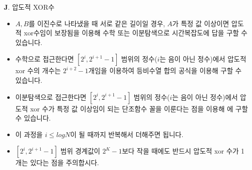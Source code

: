 \begin{frame}{\textbf{J}. 압도적 XOR수}
	\begin{itemize}
		\item $A, B$를 이진수로 나타냈을 때 서로 같은 길이일 경우, $A$가 특정 값 이상이면 압도적 xor수임이 보장됨을 이용해 수학 또는 이분탐색으로 \complexity{\logN} 시간복잡도에 답을 구할 수 있습니다.
		\item 수학으로 접근한다면 $[2^i, 2^{i+1}-1]$ 범위의 정수($i$는 음이 아닌 정수)에서 압도적 xor 수의 개수는 $2^{i+2}-1$개임을 이용하여 등비수열 합의 공식을 이용해 구할 수 있습니다.
		\item 이분탐색으로 접근한다면 $[2^i, 2^{i+1}-1]$ 범위의 정수($i$는 음이 아닌 정수)에서 압도적 xor 수가 특정 값 이상임이 되는 단조함수 꼴을 이룬다는 점을 이용해 에 구할 수 있습니다. 
		\item 이 과정을 $i \le logN$이 될 때까지 반복해서 더해주면 됩니다.
		\item $[2^i, 2^{i+1}-1]$ 범위 경계값이 $2^K - 1$보다 작을 때에도 반드시 압도적 xor 수가 1개는 있다는 점을 주의합시다.
	\end{itemize}
\end{frame}